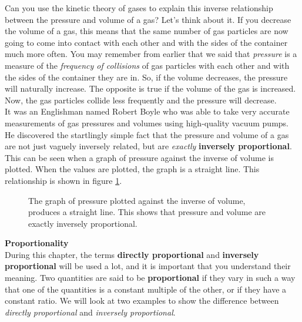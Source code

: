 Can you use the kinetic theory of gases to explain this inverse relationship between the pressure and volume of a gas? Let's think about it. If you decrease the volume of a gas, this means that the same number of gas particles are now going to come into contact with each other and with the sides of the container much more often. You may remember from earlier that we said that \textit{pressure} is a measure of the \textit{frequency of collisions} of gas particles with each other and with the sides of the container they are in. So, if the volume decreases, the pressure will naturally increase. The opposite is true if the volume of the gas is increased. Now, the gas particles collide less frequently and the pressure will decrease.\\

It was an Englishman named Robert Boyle who was able to take very accurate measurements of gas pressures and volumes using high-quality vacuum pumps. He discovered the startlingly simple fact that the pressure and volume of a gas are not just vaguely inversely related, but are \textit{exactly} \textbf{inversely proportional}. This can be seen when a graph of pressure against the inverse of volume is plotted. When the values are plotted, the graph is a straight line. This relationship is shown in figure \ref{fig:boyletwo}.
\begin{figure}[H]
\begin{center}
\caption{The graph of pressure plotted against the inverse of volume, produces a straight line. This shows that pressure and volume are exactly inversely proportional.}
\label{fig:boyletwo}
\end{center}
\end{figure}


\textbf{Proportionality}\\
During this chapter, the terms \textbf{directly proportional} and \textbf{inversely proportional} will be used a lot, and it is important that you understand their meaning. Two quantities are said to be \textbf{proportional} if they vary in such a way that one of the quantities is a constant multiple of the other, or if they have a constant ratio. We will look at two examples to show the difference between \textit{directly proportional} and \textit{inversely proportional}.

